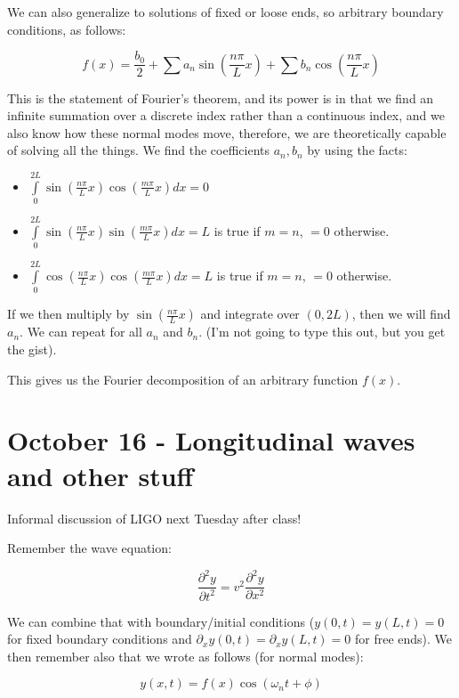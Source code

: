 \documentclass{report}
\begin{document}
We can also generalize to solutions of fixed or loose ends, so arbitrary boundary conditions, as follows:

$$f(x) = \frac{b_0}{2} + \sum{a_n \sin\left(\frac{n\pi}{L}x\right)} + \sum{b_n \cos\left(\frac{n\pi}{L}x\right)}$$

This is the statement of Fourier's theorem, and its power is in that we find an infinite summation over a discrete index rather than a continuous index, and we also know how these normal modes move, therefore, we are theoretically capable of solving all the things. We find the coefficients $a_n, b_n$ by using the facts:

\begin{itemize}
\item $\displaystyle\int\limits_0^{2L}{\sin\left(\frac{n\pi}{L}x\right)\cos\left(\frac{m\pi}{L}x\right)} dx = 0$
\item $\displaystyle\int\limits_0^{2L}{\sin\left(\frac{n\pi}{L}x\right)\sin\left(\frac{m\pi}{L}x\right)} dx = L$ is true if $m = n$, $=0$ otherwise.
\item $\displaystyle\int\limits_0^{2L}{\cos\left(\frac{n\pi}{L}x\right)\cos\left(\frac{m\pi}{L}x\right)} dx = L$ is true if $m = n$, $=0$ otherwise.
\end{itemize}

If we then multiply by $\sin\left(\frac{n\pi}{L}x\right)$ and integrate over $(0,2L)$, then we will find $a_n$. We can repeat for all $a_n$ and $b_n$. (I'm not going to type this out, but you get the gist).

This gives us the Fourier decomposition of an arbitrary function $f(x)$. 

\chapter{October 16 - Longitudinal waves and other stuff}

Informal discussion of LIGO next Tuesday after class!

Remember the wave equation: 

$$\frac{\partial^2 y}{\partial t^2} = v^2 \frac{\partial^2 y}{\partial x^2}$$

We can combine that with boundary/initial conditions ($y(0,t) = y(L,t) = 0$ for fixed boundary conditions and $\partial_xy(0,t) = \partial_xy(L,t) = 0$ for free ends). We then remember also that we wrote as follows (for normal modes):

$$y(x,t) = f(x)\cos(\omega_nt + \phi)$$
\end{document}
